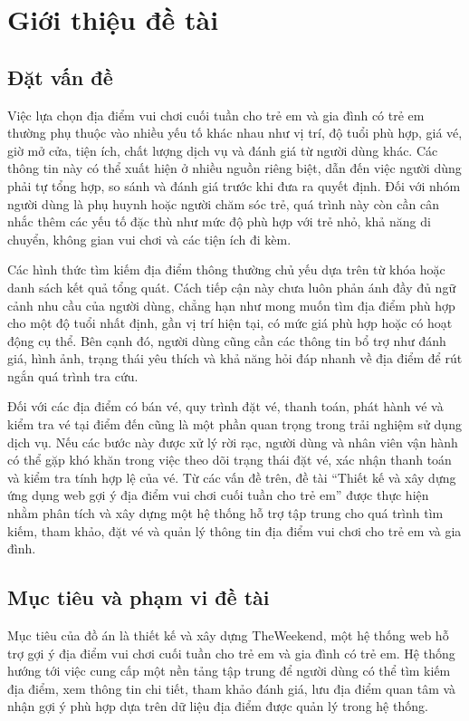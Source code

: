 \documentclass[../DoAn.tex]{subfiles}
\begin{document}
\chapter{Giới thiệu đề tài}

\section{Đặt vấn đề}

Việc lựa chọn địa điểm vui chơi cuối tuần cho trẻ em và gia đình có trẻ em thường phụ thuộc vào nhiều yếu tố khác nhau như vị trí, độ tuổi phù hợp, giá vé, giờ mở cửa, tiện ích, chất lượng dịch vụ và đánh giá từ người dùng khác. Các thông tin này có thể xuất hiện ở nhiều nguồn riêng biệt, dẫn đến việc người dùng phải tự tổng hợp, so sánh và đánh giá trước khi đưa ra quyết định. Đối với nhóm người dùng là phụ huynh hoặc người chăm sóc trẻ, quá trình này còn cần cân nhắc thêm các yếu tố đặc thù như mức độ phù hợp với trẻ nhỏ, khả năng di chuyển, không gian vui chơi và các tiện ích đi kèm.

Các hình thức tìm kiếm địa điểm thông thường chủ yếu dựa trên từ khóa hoặc danh sách kết quả tổng quát. Cách tiếp cận này chưa luôn phản ánh đầy đủ ngữ cảnh nhu cầu của người dùng, chẳng hạn như mong muốn tìm địa điểm phù hợp cho một độ tuổi nhất định, gần vị trí hiện tại, có mức giá phù hợp hoặc có hoạt động cụ thể. Bên cạnh đó, người dùng cũng cần các thông tin bổ trợ như đánh giá, hình ảnh, trạng thái yêu thích và khả năng hỏi đáp nhanh về địa điểm để rút ngắn quá trình tra cứu.

Đối với các địa điểm có bán vé, quy trình đặt vé, thanh toán, phát hành vé và kiểm tra vé tại điểm đến cũng là một phần quan trọng trong trải nghiệm sử dụng dịch vụ. Nếu các bước này được xử lý rời rạc, người dùng và nhân viên vận hành có thể gặp khó khăn trong việc theo dõi trạng thái đặt vé, xác nhận thanh toán và kiểm tra tính hợp lệ của vé. Từ các vấn đề trên, đề tài ``Thiết kế và xây dựng ứng dụng web gợi ý địa điểm vui chơi cuối tuần cho trẻ em'' được thực hiện nhằm phân tích và xây dựng một hệ thống hỗ trợ tập trung cho quá trình tìm kiếm, tham khảo, đặt vé và quản lý thông tin địa điểm vui chơi cho trẻ em và gia đình.

\section{Mục tiêu và phạm vi đề tài}

Mục tiêu của đồ án là thiết kế và xây dựng TheWeekend, một hệ thống web hỗ trợ gợi ý địa điểm vui chơi cuối tuần cho trẻ em và gia đình có trẻ em. Hệ thống hướng tới việc cung cấp một nền tảng tập trung để người dùng có thể tìm kiếm địa điểm, xem thông tin chi tiết, tham khảo đánh giá, lưu địa điểm quan tâm và nhận gợi ý phù hợp dựa trên dữ liệu địa điểm được quản lý trong hệ thống.
\end{document}
